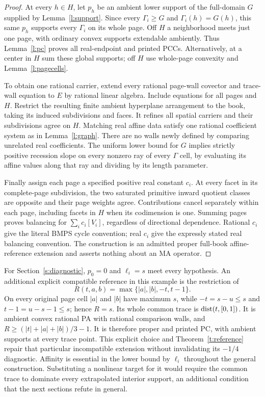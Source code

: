 \documentclass[11pt]{article}
\theoremstyle{definition}\newtheorem{definition}[theorem]{Definition}
\theoremstyle{remark}\newtheorem{remark}[theorem]{Remark}
\begin{document}
\begin{proof}
At every $h\in H$, let $p_h$ be an ambient lower support of the full-domain $G$ supplied by Lemma~\ref{l:support}. Since every $\Gamma_i\geq G$ and $\Gamma_i(h)=G(h)$, this same $p_h$ supports every $\Gamma_i$ on its whole page. Off $H$ a neighborhood meets just one page, with ordinary convex supports extendable ambiently. Thus Lemma~\ref{l:pc} proves all real-endpoint and printed PCCs. Alternatively, at a center in $H$ sum these global supports; off $H$ use whole-page convexity and Lemma~\ref{l:pagecells}.

To obtain one rational carrier, extend every rational page-wall covector and trace-wall equation to $E$ by rational linear algebra. Include equations for all pages and $H$. Restrict the resulting finite ambient hyperplane arrangement to the book, taking its induced subdivisions and faces. It refines all spatial carriers and their subdivisions agree on $H$. Matching real affine data satisfy one rational coefficient system as in Lemma~\ref{l:graph}. There are no walls newly defined by comparing unrelated real coefficients. The uniform lower bound for $G$ implies strictly positive recession slope on every nonzero ray of every $\Gamma$ cell, by evaluating its affine values along that ray and dividing by its length parameter.

Finally assign each page a specified positive real constant $c_i$. At every facet in its complete-page subdivision, the two saturated primitive inward quotient classes are opposite and their page weights agree. Contributions cancel separately within each page, including facets in $H$ when its codimension is one. Summing pages proves balancing for $\sum_i c_i[V_i]$, regardless of directional dependence. Rational $c_i$ give the literal BMPS cycle convention; real $c_i$ give the expressly stated real balancing convention. The construction is an admitted proper full-book affine-reference extension and asserts nothing about an MA operator.
\end{proof}

For Section~\ref{s:diagnostic}, $p_0=0$ and $\ell_i=s$ meet every hypothesis. An additional explicit compatible reference in this example is the restriction of
\[
 R(t,a,b)=\max\{|a|,|b|,-t,t-1\}.
\]
On every original page cell $|a|$ and $|b|$ have maximum $s$, while $-t=s-u\leq s$ and $t-1=u-s-1\leq s$; hence $R=s$. Its whole common trace is $\operatorname{dist}(t,[0,1])$. It is ambient convex rational PA with rational comparison walls, and $R\geq (|t|+|a|+|b|)/3-1$. It is therefore proper and printed PC, with ambient supports at every trace point. This explicit choice and Theorem~\ref{t:reference} repair that particular incompatible extension without invalidating its $-1/4$ diagnostic. Affinity is essential in the lower bound by $\ell_i$ throughout the general construction. Substituting a nonlinear target for it would require the common trace to dominate every extrapolated interior support, an additional condition that the next sections refute in general.
\end{document}
